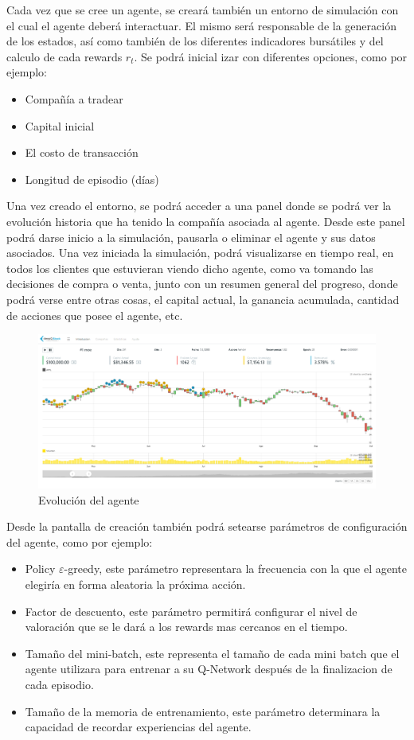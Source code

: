 Cada vez que se cree un agente, se creará también un entorno de simulación con el cual el agente deberá interactuar. El mismo será responsable de la generación de los estados, así como también de los diferentes indicadores bursátiles y del calculo de cada rewards $r_t$. Se podrá inicial izar con diferentes opciones, como por ejemplo:

\begin{itemize}
	\item Compañía a tradear
	\item Capital inicial
	\item El costo de transacción
	\item Longitud de episodio (días)
\end{itemize}


Una vez creado el entorno, se podrá acceder a una panel donde se podrá ver la evolución historia que ha tenido la compañía asociada al agente. Desde este panel podrá darse inicio a la simulación, pausarla o eliminar el agente y sus datos asociados. 
Una vez iniciada la simulación, podrá visualizarse en tiempo real, en todos los clientes que estuvieran viendo dicho agente, como va tomando las decisiones de compra o venta, junto con un resumen general del progreso, donde podrá verse
entre otras cosas, el capital actual, la ganancia acumulada, cantidad de acciones que posee el agente, etc.

\begin{figure}[h!]
	\includegraphics[scale=0.3]{imagenes/screen4.png}
	\caption{Evolución del agente}
\end{figure}


Desde la pantalla de creación también podrá setearse parámetros de configuración del agente, como por ejemplo:
\begin{itemize}
	\item Policy $\varepsilon$-greedy, este parámetro representara la frecuencia con la que el agente elegiría en forma aleatoria la próxima acción.
	\item Factor de descuento, este parámetro permitirá configurar el nivel de valoración que se le dará a los rewards mas cercanos en el tiempo.
	\item Tamaño del mini-batch, este representa el tamaño de cada mini batch que el agente utilizara para entrenar a su Q-Network después de la finalizacion de cada episodio.
	\item Tamaño de la memoria de entrenamiento, este parámetro determinara la capacidad de recordar experiencias del agente.
\end{itemize}

